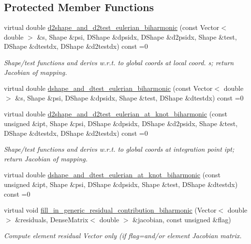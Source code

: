 \subsection*{Protected Member Functions}
\begin{DoxyCompactItemize}
\item 
virtual double \hyperlink{classoomph_1_1MyBiharmonicEquations_a4597b3938b6f1244d6e8e0f58250c14a}{d2shape\+\_\+and\+\_\+d2test\+\_\+eulerian\+\_\+biharmonic} (const Vector$<$ double $>$ \&s, Shape \&psi, D\+Shape \&dpsidx, D\+Shape \&d2psidx, Shape \&test, D\+Shape \&dtestdx, D\+Shape \&d2testdx) const =0
\begin{DoxyCompactList}\small\item\em Shape/test functions and derivs w.\+r.\+t. to global coords at local coord. s; return Jacobian of mapping. \end{DoxyCompactList}\item 
virtual double \hyperlink{classoomph_1_1MyBiharmonicEquations_a084eaadd62185dad622c7708862f023a}{dshape\+\_\+and\+\_\+dtest\+\_\+eulerian\+\_\+biharmonic} (const Vector$<$ double $>$ \&s, Shape \&psi, D\+Shape \&dpsidx, Shape \&test, D\+Shape \&dtestdx) const =0
\item 
virtual double \hyperlink{classoomph_1_1MyBiharmonicEquations_a85687f39c0fb72f25ce67f5867a83470}{d2shape\+\_\+and\+\_\+d2test\+\_\+eulerian\+\_\+at\+\_\+knot\+\_\+biharmonic} (const unsigned \&ipt, Shape \&psi, D\+Shape \&dpsidx, D\+Shape \&d2psidx, Shape \&test, D\+Shape \&dtestdx, D\+Shape \&d2testdx) const =0
\begin{DoxyCompactList}\small\item\em Shape/test functions and derivs w.\+r.\+t. to global coords at integration point ipt; return Jacobian of mapping. \end{DoxyCompactList}\item 
virtual double \hyperlink{classoomph_1_1MyBiharmonicEquations_a08e45fddb2c25119e6ba826cd6cafdbf}{dshape\+\_\+and\+\_\+dtest\+\_\+eulerian\+\_\+at\+\_\+knot\+\_\+biharmonic} (const unsigned \&ipt, Shape \&psi, D\+Shape \&dpsidx, Shape \&test, D\+Shape \&dtestdx) const =0
\item 
virtual void \hyperlink{classoomph_1_1MyBiharmonicEquations_a7c8e87734c960107ed1dc7f2e0b4f891}{fill\+\_\+in\+\_\+generic\+\_\+residual\+\_\+contribution\+\_\+biharmonic} (Vector$<$ double $>$ \&residuals, Dense\+Matrix$<$ double $>$ \&jacobian, const unsigned \&flag)
\begin{DoxyCompactList}\small\item\em Compute element residual Vector only (if flag=and/or element Jacobian matrix. \end{DoxyCompactList}\item 

\end{DoxyCompactItemize}
